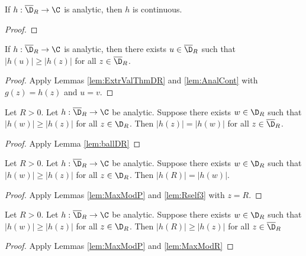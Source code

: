 \begin{lemma} \label{lem:AnalCont}  \leanok
If $h:\overline{\D}_R \to \C$ is analytic, then $h$ is continuous.
\end{lemma}
\begin{proof} \leanok
\end{proof}

\begin{lemma} \label{lem:ExtrValThmh}  \leanok
If $h:\overline{\D}_R \to \C$ is analytic, then there exists $u\in \overline{\D}_R$ such that $|h(u)| \ge |h(z)|$ for all $z\in \overline{\D}_R$.
\end{lemma}
\begin{proof} \leanok
{}
Apply Lemmas \ref{lem:ExtrValThmDR} and \ref{lem:AnalCont} with $g(z)=h(z)$ and $u=v$.
\end{proof}


\begin{lemma} \label{lem:MaxModP}  \leanok
Let $R>0$. Let $h:\overline{\D}_R \to \C$ be analytic. Suppose there exists $w\in \D_R$ such that $|h(w)| \ge |h(z)|$ for all $z\in \D_R$. Then $|h(z)|=|h(w)|$ for all $z\in \overline{\D}_R$.
\end{lemma}
\begin{proof} \leanok
{}
Apply Lemma \ref{lem:ballDR}
\end{proof}

\begin{lemma} \label{lem:MaxModR}  \leanok
Let $R>0$. Let $h:\overline{\D}_R \to \C$ be analytic. Suppose there exists $w\in \D_R$ such that $|h(w)| \ge |h(z)|$ for all $z\in \D_R$. Then $|h(R)|=|h(w)|$.
\end{lemma}
\begin{proof} \leanok
{}
Apply Lemmas \ref{lem:MaxModP} and \ref{lem:Rself3} with $z=R$.
\end{proof}

\begin{lemma} \label{lem:MaxModRR}  \leanok
Let $R>0$. Let $h:\overline{\D}_R \to \C$ be analytic. Suppose there exists $w\in \D_R$ such that $|h(w)| \ge |h(z)|$ for all $z\in \D_R$. Then $|h(R)|\ge |h(z)|$ for all $z\in \overline{\D}_R$
\end{lemma}
\begin{proof} \leanok
{}
Apply Lemmas \ref{lem:MaxModP} and \ref{lem:MaxModR}
\end{proof}


